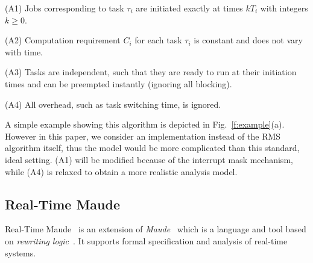 \documentclass[12pt,onecolumn]{IEEEtranTIE}
\begin{document}
(A1) Jobs corresponding to task $\tau_i$ are initiated exactly at
times $kT_i$ with integers $k\ge 0$.

(A2) Computation requirement $C_i$ for each task $\tau_i$ is constant
and does not vary with time.

(A3) Tasks are independent, such that they are ready to run at their
initiation times and can be preempted instantly (ignoring all
blocking).

(A4) All overhead, such as task switching time, is ignored.

A simple example showing this algorithm is depicted in
Fig.~\ref{f:example}(a). However in this paper, we consider an
implementation instead of the RMS algorithm itself, thus the model
would be more complicated than this standard, ideal setting.  (A1)
will be modified because of the interrupt mask mechanism, while (A4)
is relaxed to obtain a more realistic analysis model.

\subsection{Real-Time Maude}
Real-Time Maude~\cite{DBLP:journals/lisp/OlveczkyM07} is an extension
of \emph{Maude}~\cite{DBLP:journals/tcs/ClavelDELMMQ02} which is a
language and tool based on \emph{rewriting
  logic}~\cite{DBLP:journals/jlp/Meseguer12}.  It supports formal
specification and analysis of real-time systems.
\end{document}
